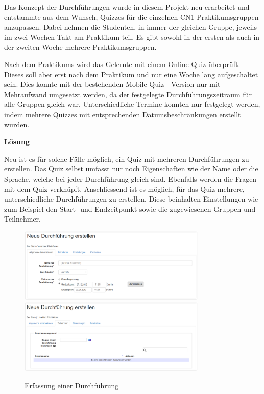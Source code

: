 Das Konzept der Durchführungen wurde in diesem Projekt neu erarbeitet und entstammte aus dem Wunsch, Quizzes für die einzelnen \acrshort{CN1}-Praktikumsgruppen anzupassen. Dabei nehmen die Studenten, in immer der gleichen Gruppe, jeweils im zwei-Wochen-Takt am Praktikum teil. Es gibt sowohl in der ersten als auch in der zweiten Woche mehrere Praktikumsgruppen.

Nach dem Praktikums wird das Gelernte mit einem Online-Quiz überprüft. Dieses soll aber erst nach dem Praktikum und nur eine Woche lang aufgeschaltet sein. Dies konnte mit der bestehenden Mobile Quiz - Version nur mit Mehraufwand umgesetzt werden, da der festgelegte Durchführungszeitraum für alle Gruppen gleich war. Unterschiedliche Termine konnten nur festgelegt werden, indem mehrere Quizzes mit entsprechenden Datumsbeschränkungen erstellt wurden.

\bigskip\bigskip

\textbf{Lösung}
\bigskip

Neu ist es für solche Fälle möglich, ein Quiz mit mehreren Durchführungen zu erstellen. Das Quiz selbst umfasst nur noch Eigenschaften wie der Name oder die Sprache, welche bei jeder Durchführung gleich sind. Ebenfalls werden die Fragen mit dem Quiz verknüpft. Anschliessend ist es möglich, für das Quiz mehrere, unterschiedliche Durchführungen zu erstellen. Diese beinhalten Einstellungen wie zum Beispiel den Start- und Endzeitpunkt sowie die zugewiesenen Gruppen und Teilnehmer.


\begin{figure}[H]
	\centering
	\includegraphics[width=0.8\textwidth]{Images/Quiz_Durchfuehrung1.PNG}
	\includegraphics[width=0.8\textwidth]{Images/Quiz_Durchfuehrung2.PNG}
	\caption{Erfassung einer Durchführung}
\end{figure}



